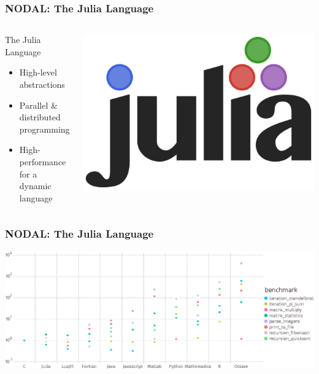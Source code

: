 \documentclass[10pt, compress, aspectratio=169]{beamer}
\begin{document}
\begin{frame}
    \frametitle{NODAL: The Julia Language}
    \begin{columns}[c]
        \begin{block}{The Julia Language}
            \begin{itemize}
                \item \alert{High-level abstractions}
                \item \alert{Parallel \& distributed} programming
                \item \alert{High-performance} for a dynamic language
            \end{itemize}
        \end{block}

        \begin{center}
            \includegraphics[width=.7\columnwidth]{julia}
        \end{center}

    \end{columns}
\end{frame}

\begin{frame}
    \frametitle{NODAL: The Julia Language}
    \begin{center}
        \includegraphics[width=.95\textwidth]{julia_benchmarks}
    \end{center}
\end{frame}
\end{document}
